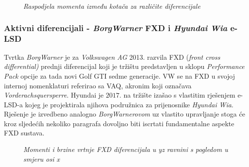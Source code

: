 \documentclass[11pt]{article}
\numberwithin{equation}{section}%
\begin{document}
\begin{figure}[!h] 
  \begin{subfigure}[b]{0.5\linewidth}
    \centering
    \def\svgwidth{8cm}
 
 \caption{\textit{}}
    \label{fig7:a} 
    \vspace{4ex}
  \end{subfigure}%
  \begin{subfigure}[b]{0.5\linewidth}
    \centering
    \def\svgwidth{8cm}
 
 \caption{\textit{}}
    \label{fig7:b} 
    \vspace{4ex}
  \end{subfigure} 
  \begin{subfigure}[b]{0.5\linewidth}
    \centering
    \def\svgwidth{8cm}
 
 \caption{\textit{}}
    \label{fig7:c} 
  \end{subfigure}%
  \begin{subfigure}[b]{0.5\linewidth}
    \centering
     \def\svgwidth{6,95cm}
 
 \caption{\textit{}}
 	\label{ara}
\end{subfigure}
  \caption{\textit{Raspodjela momenta između kotača za različite diferencijale} \cite{englet1}}
  \label{fig7} 
\end{figure}

	\subsubsection{Aktivni diferencijali - \textit{BorgWarner} FXD i \textit{Hyundai} \textit{Wia} e-LSD}

Tvrtka \textit{BorgWarner} je za \textit{Volkswagen AG} 2013. razvila FXD (\textit{front cross differential)} prednji diferencijal koji je tržištu predstavljen u sklopu \textit{Performance Pack} opcije za tada novi Golf GTI sedme generacije. VW se na FXD u svojoj internoj nomenklaturi referirao sa VAQ, akronim koji označava \textit{Vorderachsquersperre}. Hyundai je $2017.$ na tržište izašao s vlastitim rješenjem e-LSD-a kojeg je projektirala njihova podružnica za prijenosnike \textit{Hyundai} \textit{Wia}. Rješenje je izvedbeno analogno \textit{BorgWarnerovom} uz vlastito upravljanje stoga će kroz sljedećih nekoliko paragrafa dovoljno biti iscrtati fundamentalne aspekte FXD sustava.

\begin{figure}[ht]
 \centering
 \def\svgwidth{15cm}
 
 \caption{\textit{Momenti i brzine vrtnje FXD diferencijala u yz ravnini s pogledom u smjeru osi x} \cite{2023basiclars}}
 \label{fig:fxd}
\end{figure} 
\end{document}
